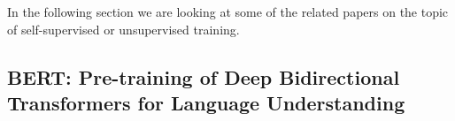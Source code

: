 In the following section we are looking at some of the related papers on the topic of self-supervised  or unsupervised training. \par



\subsection{BERT: Pre-training of Deep Bidirectional Transformers for Language Understanding} \label{sec:stateofart:bert}

